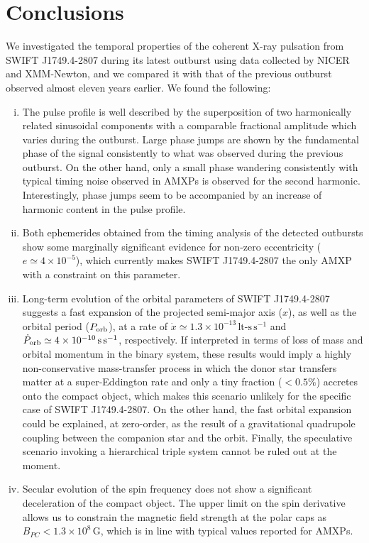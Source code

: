 \documentclass[fleqn,usenatbib]{mnras}
\newcommand{\swiftj}{SWIFT J1749.4-2807}
\newcommand{\nicer}{NICER}
\newcommand{\xmm}{XMM-Newton}
\begin{document}
\section{Conclusions}
We investigated the temporal properties of the coherent X-ray pulsation from \swiftj{} during its latest outburst using data collected by \nicer{} and \xmm{}, and we compared it with that of the previous outburst observed almost eleven years earlier. We found the following:

\begin{enumerate}[i)]
  \item The pulse profile is well described by the superposition of two harmonically related sinusoidal components with a comparable fractional amplitude which varies during the outburst. Large phase jumps are shown by the fundamental phase of the signal consistently to what was observed during the previous outburst. On the other hand, only a small phase wandering consistently with typical timing noise observed in AMXPs is observed for the second harmonic. Interestingly, phase jumps seem to be accompanied by an increase of harmonic content in the pulse profile. 
  \item Both ephemerides obtained from the timing analysis of the detected outbursts show some marginally significant evidence for non-zero eccentricity ($e\simeq4\times 10^{-5}$), which currently makes \swiftj{} the only AMXP with a constraint on this parameter.   
  \item Long-term evolution of the orbital parameters of \swiftj{} suggests a fast expansion of the projected semi-major axis ($x$), as well as the orbital period ($P_{\rm orb}$), at a rate of $\dot{x}\simeq 1.3\times 10^{-13}\,\text{lt-s}\,\text{s}^{-1}$ and $\dot{P}_{\rm orb}\simeq 4 \times 10^{-10}\,\text{s}\,\text{s}^{-1}$, respectively. If interpreted in terms of loss of mass and orbital momentum in the binary system, these results would imply a highly non-conservative mass-transfer process in which the donor star transfers matter at a super-Eddington rate and only a tiny fraction ($< 0.5\%$) accretes onto the compact object, which makes this scenario unlikely for the specific case of \swiftj{}. On the other hand, the fast orbital expansion could be explained, at zero-order, as the result of a gravitational quadrupole coupling between the companion star and the orbit. Finally, the speculative scenario invoking a hierarchical triple system cannot be ruled out at the moment.  
  \item Secular evolution of the spin frequency does not show a significant deceleration of the compact object. The upper limit on the spin derivative allows us to constrain the magnetic field strength at the polar caps as $B_{PC}<1.3\times 10^{8}\,\text{G}$, which is in line with typical values reported for AMXPs.  
\end{enumerate}
\end{document}
